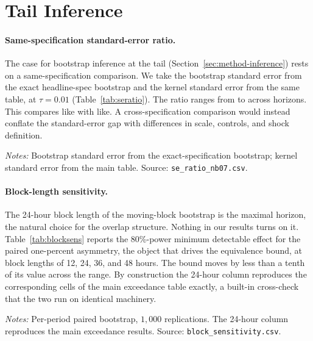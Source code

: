 \section{Tail Inference}
\label{app:inference}

\paragraph{Same-specification standard-error ratio.}
The case for bootstrap inference at the tail
(Section~\ref{sec:method-inference}) rests on a same-specification
comparison. We take the bootstrap standard error from the exact headline-spec
bootstrap and the kernel standard error from the same table, at
$\tau = 0.01$ (Table~\ref{tab:seratio}). The ratio ranges from
\SeRatioMin{} to \SeRatioMax{} across horizons. This compares like with like.
A cross-specification comparison would instead conflate the standard-error
gap with differences in scale, controls, and shock definition.

\begin{table}[t]
\centering
\caption{Kernel versus bootstrap standard errors, same specification,
$\tau = 0.01$.}
\label{tab:seratio}

\begin{minipage}{0.85\textwidth}
\vspace{2pt}
{\scriptsize \emph{Notes:} Bootstrap standard error from the
exact-specification bootstrap; kernel standard error from the main
table. Source: \texttt{se\_ratio\_nb07.csv}.}
\end{minipage}
\end{table}

\paragraph{Block-length sensitivity.}
The 24-hour block length of the moving-block bootstrap is the maximal
horizon, the natural choice for the overlap structure. Nothing in our results
turns on it. Table~\ref{tab:blocksens} reports the 80\%-power minimum
detectable effect for the paired one-percent asymmetry, the object that
drives the equivalence bound, at block lengths of 12, 24, 36, and 48
hours. The bound moves by less than a tenth of its value across the range.
By construction the 24-hour column reproduces the corresponding cells of the
main exceedance table exactly, a built-in cross-check that the two run on
identical machinery.

\begin{table}[t]
\centering
\caption{Block-length sensitivity of the equivalence bound (MDE at 80\%
power, $\Delta$ at $\alpha = 1\%$).}
\label{tab:blocksens}

\begin{minipage}{0.85\textwidth}
\vspace{2pt}
{\scriptsize \emph{Notes:} Per-period paired bootstrap, $1{,}000$
replications. The 24-hour column reproduces the main exceedance results.
Source: \texttt{block\_sensitivity.csv}.}
\end{minipage}
\end{table}